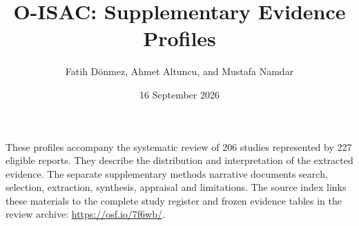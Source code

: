 \documentclass[10pt,letterpaper]{article}
\title{O-ISAC: Supplementary Evidence Profiles}
\author{Fatih D\"onmez, Ahmet Altuncu, and Mustafa Namdar}
\date{16 September 2026}
\begin{document}
\maketitle
These profiles accompany the systematic review of 206 studies represented by
227 eligible reports. They describe the distribution and interpretation of
the extracted evidence. The separate supplementary methods narrative documents
search, selection, extraction, synthesis, appraisal and limitations. The
source index links these materials to the complete study register and frozen
evidence tables in the review archive: \url{https://osf.io/7f6wb/}.


\FloatBarrier

\FloatBarrier

\begingroup\small

\endgroup
\end{document}
